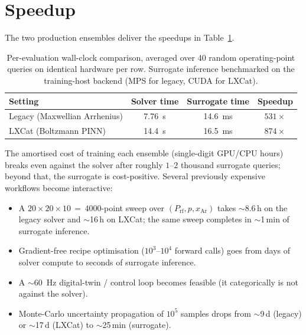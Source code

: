 \documentclass[11pt,a4paper]{article}
\begin{document}
\section{Speedup}
\label{sec:speedup}

The two production ensembles deliver the speedups in
Table~\ref{tab:speedup}.

\begin{table}[H]
  \centering
  \caption{Per-evaluation wall-clock comparison, averaged over 40
           random operating-point queries on identical hardware
           per row.  Surrogate inference benchmarked on the
           training-host backend (MPS for legacy, CUDA for LXCat).}
  \label{tab:speedup}
  \small
  \begin{tabular}{l c c c}
    \toprule
    Setting & Solver time & Surrogate time & Speedup \\
    \midrule
    Legacy (Maxwellian Arrhenius) & \SI{7.76}{\second}  & \SI{14.6}{\milli\second} & $531\times$ \\
    LXCat (Boltzmann PINN)        & \SI{14.4}{\second}  & \SI{16.5}{\milli\second} & $874\times$ \\
    \bottomrule
  \end{tabular}
\end{table}

The amortised cost of training each ensemble (single-digit GPU/CPU
hours) breaks even against the solver after roughly $1$--$2$ thousand
surrogate queries; beyond that, the surrogate is cost-positive.
Several previously expensive workflows become interactive:
\begin{itemize}[itemsep=2pt,topsep=2pt]
  \item A $20\times20\times10\,{=}\,4000$-point sweep over
        $(P_\mathrm{rf}, p, x_\mathrm{Ar})$ takes $\sim$8.6\,h on
        the legacy solver and $\sim$16\,h on LXCat; the same sweep
        completes in $\sim$1\,min of surrogate inference.
  \item Gradient-free recipe optimisation
        ($10^3$--$10^4$ forward calls) goes from days of solver
        compute to seconds of surrogate inference.
  \item A $\sim$\SI{60}{\hertz} digital-twin / control loop becomes
        feasible (it categorically is not against the solver).
  \item Monte-Carlo uncertainty propagation of $10^5$ samples drops
        from $\sim$9\,d (legacy) or $\sim$17\,d (LXCat) to
        $\sim$25\,min (surrogate).
\end{itemize}
\end{document}
